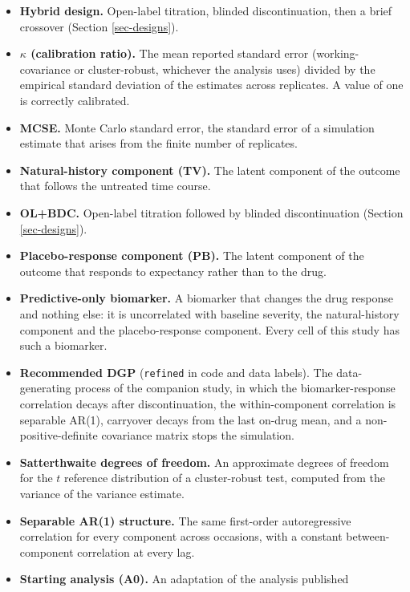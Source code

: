 \documentclass[
  11pt,
]{article}
\begin{document}
\begin{itemize}
  being on drug by design: one during open-label periods and one
  half during blinded periods. It scales the placebo-response
  component.
\item
  \textbf{Hybrid design.} Open-label titration, blinded discontinuation,
  then a brief crossover (Section \ref{sec-designs}).
\item
  \textbf{\(\kappa\) (calibration ratio).} The mean reported standard error
  (working-covariance or cluster-robust, whichever the analysis uses)
  divided by the empirical standard deviation of the estimates across
  replicates. A value of one is correctly calibrated.
\item
  \textbf{MCSE.} Monte Carlo standard error, the standard error of a
  simulation estimate that arises from the finite number of
  replicates.
\item
  \textbf{Natural-history component (TV).} The latent component of the
  outcome that follows the untreated time course.
\item
  \textbf{OL+BDC.} Open-label titration followed by blinded discontinuation
  (Section \ref{sec-designs}).
\item
  \textbf{Placebo-response component (PB).} The latent component of the
  outcome that responds to expectancy rather than to the drug.
\item
  \textbf{Predictive-only biomarker.} A biomarker that changes the drug
  response and nothing else: it is uncorrelated with baseline
  severity, the natural-history component and the placebo-response
  component. Every cell of this study has such a biomarker.
\item
  \textbf{Recommended DGP} (\texttt{refined} in code and data labels). The
  data-generating process of the companion study, in which the
  biomarker-response correlation decays after discontinuation, the
  within-component correlation is separable AR(1), carryover decays
  from the last on-drug mean, and a non-positive-definite covariance
  matrix stops the simulation.
\item
  \textbf{Satterthwaite degrees of freedom.} An approximate degrees of
  freedom for the \(t\) reference distribution of a cluster-robust
  test, computed from the variance of the variance estimate.
\item
  \textbf{Separable AR(1) structure.} The same first-order autoregressive
  correlation for every component across occasions, with a constant
  between-component correlation at every lag.
\item
  \textbf{Starting analysis (A0).} An adaptation of the analysis published

\end{itemize}
\end{document}
